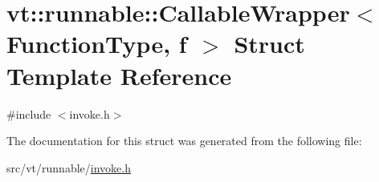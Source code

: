 \hypertarget{structvt_1_1runnable_1_1_callable_wrapper}{}\section{vt\+:\+:runnable\+:\+:Callable\+Wrapper$<$ Function\+Type, f $>$ Struct Template Reference}
\label{structvt_1_1runnable_1_1_callable_wrapper}


{\ttfamily \#include $<$invoke.\+h$>$}



The documentation for this struct was generated from the following file\+:\begin{DoxyCompactItemize}
\item 
src/vt/runnable/\hyperlink{invoke_8h}{invoke.\+h}\end{DoxyCompactItemize}
